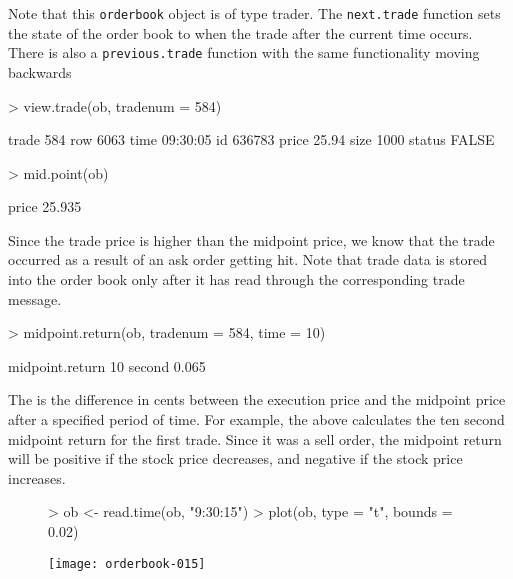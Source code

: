 \documentclass[a4paper]{report}
\begin{document}
\begin{article}
Note that this \texttt{orderbook} object is of type trader.  The
\texttt{next.trade} function sets the state of the order book to when
the trade after the current time occurs. There is also a
\texttt{previous.trade} function with the same functionality moving
backwards

\begin{Schunk}
\begin{Sinput}
> view.trade(ob, tradenum = 584)
\end{Sinput}
\begin{Soutput}
       trade 584
row         6063
time    09:30:05
id        636783
price      25.94
size        1000
status     FALSE
\end{Soutput}
\begin{Sinput}
> mid.point(ob)
\end{Sinput}
\begin{Soutput}
 price 
25.935 
\end{Soutput}
\end{Schunk}

Since the trade price is higher than the midpoint price, we know that
the trade occurred as a result of an ask order getting hit. Note that
trade data is stored into the order book only after it has read
through the corresponding trade message.

\begin{Schunk}
\begin{Sinput}
> midpoint.return(ob, tradenum = 584, time = 10)
\end{Sinput}
\begin{Soutput}
          midpoint.return
10 second           0.065
\end{Soutput}
\end{Schunk}

The  is the difference in cents between the
execution price and the midpoint price after a specified period of
time. For example, the above calculates the ten second midpoint return
for the first trade. Since it was a sell order, the midpoint return
will be positive if the stock price decreases, and negative if the
stock price increases.

\begin{figure}
\centering
\vspace*{.1in}
\begin{Schunk}
\begin{Sinput}
> ob <- read.time(ob, "9:30:15")
> plot(ob, type = "t", bounds = 0.02)
\end{Sinput}
\end{Schunk}
\texttt{[image: orderbook-015]}
\end{figure}


\end{article}
\end{document}

